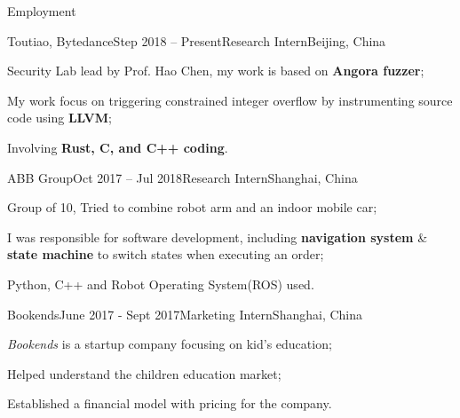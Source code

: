 \documentclass{resume} %
\begin{document}
\begin{rSection}{Employment}

\begin{rSubsection}
  {Toutiao, Bytedance}{Step 2018 – Present}{Research Intern}{Beijing, China}
    \item Security Lab lead by Prof. Hao Chen, my work is based on \textbf{Angora fuzzer};
    \item My work focus on triggering constrained integer overflow by instrumenting source code using \textbf{LLVM};
    \item Involving \textbf{Rust, C, and C++ coding}.
\end{rSubsection}


\begin{rSubsection}
  {ABB Group}{Oct 2017 – Jul 2018}{Research Intern}{Shanghai, China}
    \item Group of 10, Tried to combine robot arm and an indoor mobile car;
    \item I was responsible for software development, including \textbf{navigation system} \& \textbf{state machine} to switch states when executing an order;
    \item Python, C++ and Robot Operating System(ROS) used.
\end{rSubsection}


\begin{rSubsection}
  {Bookends}{June 2017 - Sept 2017}{Marketing Intern}{Shanghai, China}
    \item \textit{Bookends} is a startup company focusing on kid's education;
    \item Helped understand the children education market;
    \item Established a financial model with pricing for the company.
\end{rSubsection}

\end{rSection}
\end{document}
